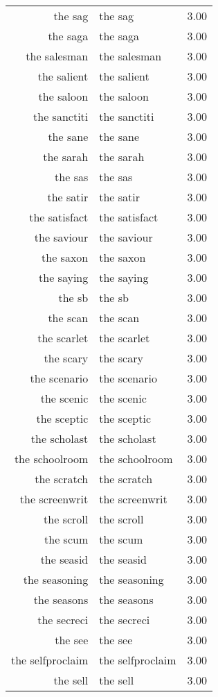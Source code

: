 \begin{table}[ht]
\begin{tabular}{rlr}
  the sag & the sag & 3.00 \\ 
  the saga & the saga & 3.00 \\ 
  the salesman & the salesman & 3.00 \\ 
  the salient & the salient & 3.00 \\ 
  the saloon & the saloon & 3.00 \\ 
  the sanctiti & the sanctiti & 3.00 \\ 
  the sane & the sane & 3.00 \\ 
  the sarah & the sarah & 3.00 \\ 
  the sas & the sas & 3.00 \\ 
  the satir & the satir & 3.00 \\ 
  the satisfact & the satisfact & 3.00 \\ 
  the saviour & the saviour & 3.00 \\ 
  the saxon & the saxon & 3.00 \\ 
  the saying & the saying & 3.00 \\ 
  the sb & the sb & 3.00 \\ 
  the scan & the scan & 3.00 \\ 
  the scarlet & the scarlet & 3.00 \\ 
  the scary & the scary & 3.00 \\ 
  the scenario & the scenario & 3.00 \\ 
  the scenic & the scenic & 3.00 \\ 
  the sceptic & the sceptic & 3.00 \\ 
  the scholast & the scholast & 3.00 \\ 
  the schoolroom & the schoolroom & 3.00 \\ 
  the scratch & the scratch & 3.00 \\ 
  the screenwrit & the screenwrit & 3.00 \\ 
  the scroll & the scroll & 3.00 \\ 
  the scum & the scum & 3.00 \\ 
  the seasid & the seasid & 3.00 \\ 
  the seasoning & the seasoning & 3.00 \\ 
  the seasons & the seasons & 3.00 \\ 
  the secreci & the secreci & 3.00 \\ 
  the see & the see & 3.00 \\ 
  the selfproclaim & the selfproclaim & 3.00 \\ 
  the sell & the sell & 3.00 \\ 

\end{tabular}
\end{table}
